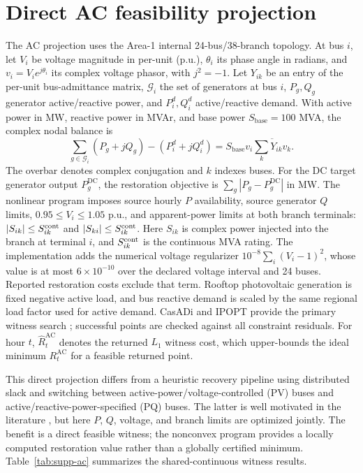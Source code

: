 \documentclass[10pt,journal,onecolumn]{IEEEtran}
\begin{document}
\section{Direct AC feasibility projection}
The AC projection uses the Area-1 internal 24-bus/38-branch topology. At bus $i$, let $V_i$ be voltage magnitude in per-unit (p.u.), $\theta_i$ its phase angle in radians, and $v_i=V_i e^{j\theta_i}$ its complex voltage phasor, with $j^2=-1$. Let $Y_{ik}$ be an entry of the per-unit bus-admittance matrix, $\mathcal G_i$ the set of generators at bus $i$, $P_g,Q_g$ generator active/reactive power, and $P_i^d,Q_i^d$ active/reactive demand. With active power in MW, reactive power in MVAr, and base power $S_{\mathrm{base}}=100$ MVA, the complex nodal balance is
\begin{equation}
\sum_{g\in\mathcal G_i}(P_g+jQ_g)-(P_i^d+jQ_i^d)
=S_{\mathrm{base}}v_i\overline{\sum_kY_{ik}v_k}.
\end{equation}
The overbar denotes complex conjugation and $k$ indexes buses. For the DC target generator output $P_g^{\mathrm{DC}}$, the restoration objective is $\sum_g|P_g-P_g^{\mathrm{DC}}|$ in MW. The nonlinear program imposes source hourly $P$ availability, source generator $Q$ limits, $0.95\le V_i\le1.05$ p.u., and apparent-power limits at both branch terminals: $|S_{ik}|\le S^{\rm cont}_{ik}$ and $|S_{ki}|\le S^{\rm cont}_{ik}$. Here $S_{ik}$ is complex power injected into the branch at terminal $i$, and $S^{\rm cont}_{ik}$ is the continuous MVA rating. The implementation adds the numerical voltage regularizer $10^{-8}\sum_i(V_i-1)^2$, whose value is at most $6\times10^{-10}$ over the declared voltage interval and 24 buses. Reported restoration costs exclude that term. Rooftop photovoltaic generation is fixed negative active load, and bus reactive demand is scaled by the same regional load factor used for active demand. CasADi and IPOPT provide the primary witness search \cite{Andersson2019,Wachter2006}; successful points are checked against all constraint residuals. For hour $t$, $\widehat R_t^{\mathrm{AC}}$ denotes the returned $L_1$ witness cost, which upper-bounds the ideal minimum $R_t^{\mathrm{AC}}$ for a feasible returned point.

This direct projection differs from a heuristic recovery pipeline using distributed slack and switching between active-power/voltage-controlled (PV) buses and active/reactive-power-specified (PQ) buses. The latter is well motivated in the literature \cite{Boateng2027}, but here $P$, $Q$, voltage, and branch limits are optimized jointly. The benefit is a direct feasible witness; the nonconvex program provides a locally computed restoration value rather than a globally certified minimum. Table~\ref{tab:supp-ac} summarizes the shared-continuous witness results.
\end{document}
